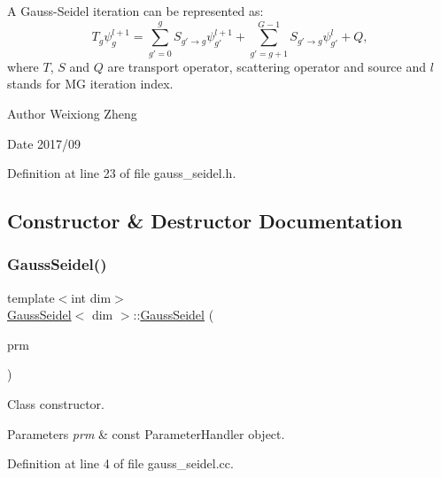 A Gauss-\/\+Seidel iteration can be represented as\+: \[ T_g\psi_g^{l+1}=\sum\limits_{g'=0}^{g}S_{g'\to g}\psi_{g'}^{l+1}+\sum\limits_{g'=g+1}^{G-1}S_{g'\to g}\psi_{g'}^{l}+Q, \] where $T$, $S$ and $Q$ are transport operator, scattering operator and source and $l$ stands for MG iteration index.

\begin{DoxyAuthor}{Author}
Weixiong Zheng 
\end{DoxyAuthor}
\begin{DoxyDate}{Date}
2017/09 
\end{DoxyDate}


Definition at line 23 of file gauss\+\_\+seidel.\+h.



\subsection{Constructor \& Destructor Documentation}
\mbox{\label{class_gauss_seidel_a6024b3a7447aa8fb1cd0bd513c1af81e}} 
\subsubsection{\texorpdfstring{Gauss\+Seidel()}{GaussSeidel()}}
{\footnotesize\ttfamily template$<$int dim$>$ \\
\hyperlink{class_gauss_seidel}{Gauss\+Seidel}$<$ dim $>$\+::\hyperlink{class_gauss_seidel}{Gauss\+Seidel} (\begin{DoxyParamCaption}\item[{const Parameter\+Handler \&}]{prm }\end{DoxyParamCaption})}

Class constructor.


\begin{DoxyParams}{Parameters}
{\em prm} & const Parameter\+Handler object. \\
\hline
\end{DoxyParams}


Definition at line 4 of file gauss\+\_\+seidel.\+cc.

\mbox{\label{class_gauss_seidel_a4d41231183512ec5aab1fa7088c60788}} 
